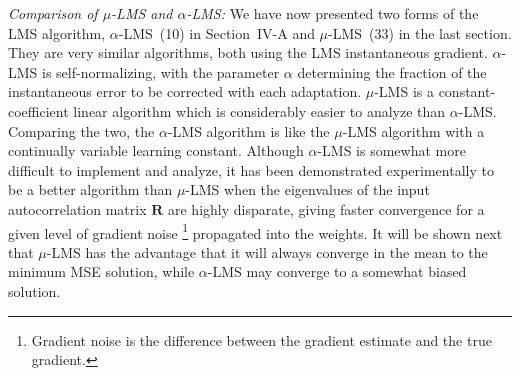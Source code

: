 \documentclass[10pt,twocolumn]{article}
\newcommand{\R}{\bm{R}}
\begin{document}
\textit{Comparison of $\mu$-LMS and $\alpha$-LMS:} We have now presented two forms
of the LMS algorithm, $\alpha$-LMS~(10) in Section~IV-A and $\mu$-LMS~(33) in the
last section. They are very similar algorithms, both using the LMS instantaneous
gradient. $\alpha$-LMS is self-normalizing, with the parameter $\alpha$ determining
the fraction of the instantaneous error to be corrected with each adaptation.
$\mu$-LMS is a constant-coefficient linear algorithm which is considerably easier
to analyze than $\alpha$-LMS. Comparing the two, the $\alpha$-LMS algorithm is like
the $\mu$-LMS algorithm with a continually variable learning constant. Although
$\alpha$-LMS is somewhat more difficult to implement and analyze, it has been
demonstrated experimentally to be a better algorithm than $\mu$-LMS when the
eigenvalues of the input autocorrelation matrix $\R$ are highly disparate, giving
faster convergence for a given level of gradient noise%
\footnote{Gradient noise is the difference between the gradient estimate and the
true gradient.}
propagated into the weights. It will be shown next that $\mu$-LMS has the advantage
that it will always converge in the mean to the minimum MSE solution, while
$\alpha$-LMS may converge to a somewhat biased solution.
\end{document}

